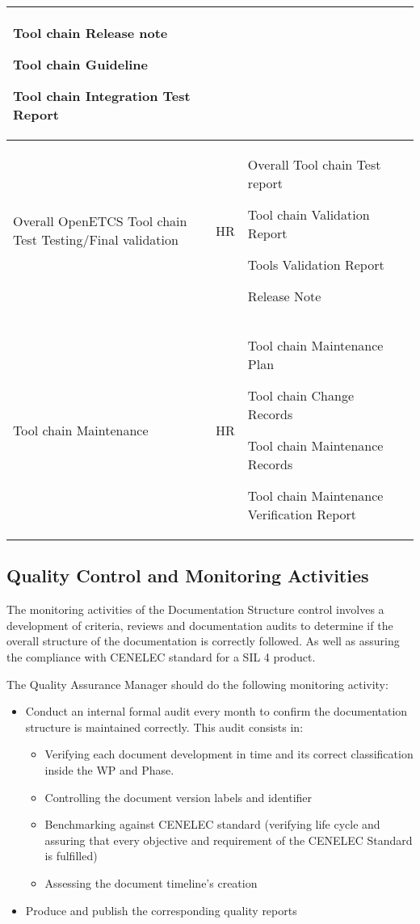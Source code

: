 \documentclass{template/openetcs_article}
\begin{document}
\begin{center}
\begin{longtable}{|m{2cm}|m{1.5cm}|m{8cm}|m{3cm}|}
Tool chain Release note

Tool chain Guideline

Tool chain Integration Test Report
&
\\\hline
Overall OpenETCS Tool chain Test Testing/Final validation &
\centering \gls{HR} &
Overall Tool chain Test report

Tool chain Validation Report

Tools Validation Report
 
Release Note &
\\\hline
Tool chain Maintenance &
\centering \gls{HR} &
Tool chain Maintenance Plan

Tool chain Change Records

Tool chain Maintenance Records

Tool chain Maintenance Verification Report
&
\\\hline
\end{longtable}
\end{center}


\subsection{Quality Control and Monitoring Activities}
The monitoring activities of the Documentation Structure control involves a development of  criteria, reviews and documentation audits to determine if the overall structure of the documentation is correctly followed. As well as assuring the compliance with CENELEC standard for a SIL 4 product.

The Quality Assurance Manager should do the following monitoring activity:
\begin{itemize}
\item Conduct an internal formal audit every month to confirm the documentation structure is maintained correctly. This audit consists in:
\begin{itemize}
\item Verifying each document development in time and its correct classification inside the WP and Phase.
\item Controlling the document version labels and identifier
\item Benchmarking against CENELEC standard (verifying life cycle and assuring that every objective and requirement of the CENELEC Standard is fulfilled)
\item Assessing the document timeline’s creation
\end{itemize}
\item Produce and publish the corresponding quality reports
\end{itemize}
\end{document}
